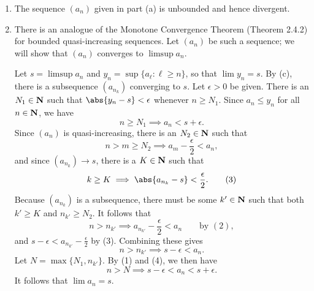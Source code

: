 \documentclass{lew98_solutions}
\begin{document}
\begin{solution}
\begin{enumerate}
        \item The sequence \( (a_n) \) given in part (a) is unbounded and hence divergent.

        \item There is an analogue of the Monotone Convergence Theorem (Theorem 2.4.2) for bounded quasi-increasing sequences. Let \( (a_n) \) be such a sequence; we will show that \( (a_n) \) converges to \( \limsup a_n \).

        Let \( s = \limsup a_n \) and \( y_n = \sup \{ a_{\ell} : \ell \geq n \} \), so that \( \lim y_n = s \). By  (c), there is a subsequence \( (a_{n_k}) \) converging to \( s \). Let \( \epsilon > 0 \) be given. There is an \( N_1 \in \mathbf{N} \) such that \( \abs{y_n - s} < \epsilon \) whenever \( n \geq N_1 \). Since \( a_n \leq y_n \) for all \( n \in \mathbf{N} \), we have
        \[
            n \geq N_1 \implies a_n < s + \epsilon. \tag{1}
        \]
        Since \( (a_n) \) is quasi-increasing, there is an \( N_2 \in \mathbf{N} \) such that
        \[
            n > m \geq N_2 \implies a_m - \frac{\epsilon}{2} < a_n, \tag{2}
        \]
        and since \( (a_{n_k}) \to s \), there is a \( K \in \mathbf{N} \) such that
        \[
            k \geq K \implies \abs{a_{n_k} - s} < \frac{\epsilon}{2}. \tag{3}
        \]
        Because \( (a_{n_k}) \) is a subsequence, there must be some \( k' \in \mathbf{N} \) such that both \( k' \geq K \) and \( n_{k'} \geq N_2 \). It follows that
        \[
            n > n_{k'} \implies a_{n_{k'}} - \frac{\epsilon}{2} < a_n \qquad \text{by } (2),
        \]
        and \( s - \epsilon < a_{n_{k'}} - \tfrac{\epsilon}{2} \) by (3). Combining these gives
        \[
            n > n_{k'} \implies s - \epsilon < a_n. \tag{4}
        \]
        Let \( N = \max \{ N_1, n_{k'} \} \). By (1) and (4), we then have
        \[
            n > N \implies s - \epsilon < a_n < s + \epsilon.
        \]
        It follows that \( \lim a_n = s \).
    \end{enumerate}
\end{solution}
\end{document}
